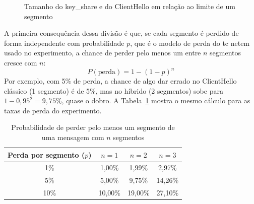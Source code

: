 \documentclass[12pt,a4paper]{article}
\newcommand{\fonte}[1]{\par\vspace{4pt}{\small Fonte: #1}}
\begin{document}
\begin{figure}[H]
\centering
\caption{Tamanho do key\_share e do ClientHello em relação ao limite de um segmento}
\label{fig:barras}
\fonte{Elaborado pelos autores com dados de Langley, Hamburg e Turner (2016), Kwiatkowski et al. (2026) e Ristic (2026).}
\end{figure}



A primeira consequência dessa divisão é que, se cada segmento é perdido de
forma independente com probabilidade $p$, que é o modelo de perda do tc
netem usado no experimento, a chance de perder pelo menos um entre $n$
segmentos cresce com $n$:
\begin{equation}
P(\text{perda}) = 1 - (1-p)^n
\label{eq:perda}
\end{equation}
Por exemplo, com 5\% de perda, a chance de algo dar errado no
ClientHello clássico (1 segmento) é de 5\%, mas no híbrido (2
segmentos) sobe para $1 - 0{,}95^2 = 9{,}75\%$, quase o dobro. A
Tabela~\ref{tab:perda} mostra o mesmo cálculo para as taxas de perda do
experimento.

\begin{table}[H]
\centering
\caption{Probabilidade de perder pelo menos um segmento de uma mensagem com $n$ segmentos}
\label{tab:perda}
\begin{tabular}{cccc}
\toprule
Perda por segmento ($p$) & $n=1$ & $n=2$ & $n=3$ \\
\midrule
1\%  & 1,00\%  & 1,99\%  & 2,97\% \\
5\%  & 5,00\%  & 9,75\%  & 14,26\% \\
10\% & 10,00\% & 19,00\% & 27,10\% \\
\bottomrule
\end{tabular}
\fonte{Elaborado pelos autores.}
\end{table}
\end{document}
